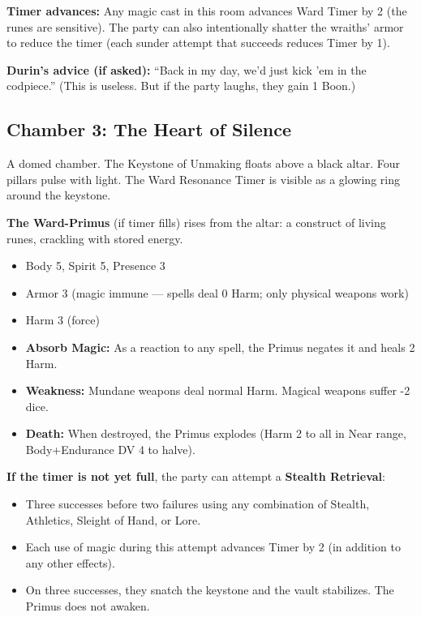 \documentclass[11pt, a4paper]{article}
\begin{document}
\textbf{Timer advances:} Any magic cast in this room advances Ward Timer by 2 (the runes are sensitive). The party can also intentionally shatter the wraiths' armor to reduce the timer (each sunder attempt that succeeds reduces Timer by 1).

\textbf{Durin's advice (if asked):} ``Back in my day, we'd just kick 'em in the codpiece.'' (This is useless. But if the party laughs, they gain 1 Boon.)

\subsection{Chamber 3: The Heart of Silence}

A domed chamber. The Keystone of Unmaking floats above a black altar. Four pillars pulse with light. The Ward Resonance Timer is visible as a glowing ring around the keystone.

\textbf{The Ward-Primus} (if timer fills) rises from the altar: a construct of living runes, crackling with stored energy.

\begin{itemize}
\item Body 5, Spirit 5, Presence 3
\item Armor 3 (magic immune --- spells deal 0 Harm; only physical weapons work)
\item Harm 3 (force)
\item \textbf{Absorb Magic:} As a reaction to any spell, the Primus negates it and heals 2 Harm.
\item \textbf{Weakness:} Mundane weapons deal normal Harm. Magical weapons suffer -2 dice.
\item \textbf{Death:} When destroyed, the Primus explodes (Harm 2 to all in Near range, Body+Endurance DV 4 to halve).
\end{itemize}

\textbf{If the timer is not yet full}, the party can attempt a \textbf{Stealth Retrieval}:
\begin{itemize}
\item Three successes before two failures using any combination of Stealth, Athletics, Sleight of Hand, or Lore.
\item Each use of magic during this attempt advances Timer by 2 (in addition to any other effects).
\item On three successes, they snatch the keystone and the vault stabilizes. The Primus does not awaken.
\end{itemize}
\end{document}
